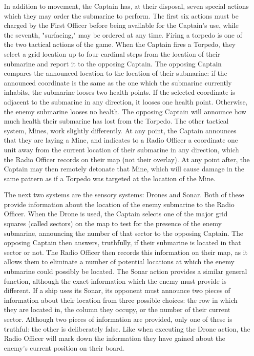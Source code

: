 
In addition to movement, the Captain has, at their disposal, seven special actions which they may order the submarine to perform. The first six actions must be charged by the First Officer before being available for the Captain's use, while the seventh, "surfacing," may be ordered at any time. Firing a torpedo is one of the two tactical actions of the game. When the Captain fires a Torpedo, they select a grid location up to four cardinal steps from the location of their submarine and report it to the opposing Captain. The opposing Captain compares the announced location to the location of their submarine: if the announced coordinate is the same as the one which the submarine currently inhabits, the submarine looses two health points. If the selected coordinate is adjacent to the submarine in any direction, it looses one health point. Otherwise, the enemy submarine looses no health. The opposing Captain will announce how much health their submarine has lost from the Torpedo. The other tactical system, Mines, work slightly differently. At any point, the Captain announces that they are laying a Mine, and indicates to a Radio Officer a coordinate one unit away from the current location of their submarine in any direction, which the Radio Officer records on their map (not their overlay). At any point after, the Captain may then remotely detonate that Mine, which will cause damage in the same pattern as if a Torpedo was targeted at the location of the Mine. 


The next two systems are the sensory systems: Drones and Sonar. Both of these provide information about the location of the enemy submarine to the Radio Officer. When the Drone is used, the Captain selects one of the major grid squares (called sectors) on the map to test for the presence of the enemy submarine, announcing the number of that sector to the opposing Captain. The opposing Captain then answers, truthfully, if their submarine is located in that sector or not. The Radio Officer then records this information on their map, as it allows them to eliminate a number of potential locations at which the enemy submarine could possibly be located. The Sonar action provides a similar general function, although the exact information which the enemy must provide is different. If a ship uses its Sonar, its opponent must announce two pieces of information about their location from three possible choices: the row in which they are located in, the column they occupy, or the number of their current sector. Although two pieces of information are provided, only one of these is truthful: the other is deliberately false. Like when executing the Drone action, the Radio Officer will mark down the information they have gained about the enemy's current position on their board.


